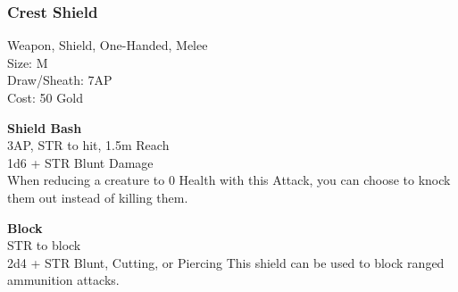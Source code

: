 \subsubsection{Crest Shield}\label{weapon:crestShield}
Weapon, Shield, One-Handed, Melee\\
Size: M\\
Draw/Sheath: 7AP\\
Cost: 50 Gold

\textbf{Shield Bash}\\
3AP, STR to hit, 1.5m Reach\\
1d6 + \texttimes STR Blunt Damage\\
When reducing a creature to 0 Health with this Attack, you can choose to knock them out instead of killing them.

\textbf{Block}\\
STR to block\\
2d4 + \texttimes STR Blunt, Cutting, or Piercing
This shield can be used to block ranged ammunition attacks.\\

